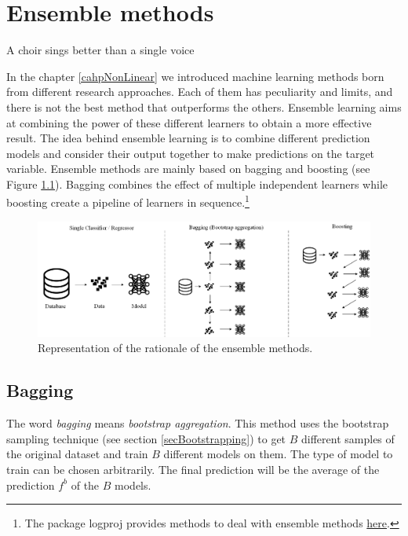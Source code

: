 \chapter{Ensemble methods}{A choir sings better than a single voice} \label{cahpEnsemble}

In the chapter \ref{cahpNonLinear} we introduced machine learning methods born from different research approaches. Each of them has peculiarity and limits, and there is not the best method that outperforms the others. Ensemble learning aims at combining the power of these different learners to obtain a more effective result. The idea behind ensemble learning is to combine different prediction models and consider their output together to make predictions on the target variable. Ensemble methods are mainly based on bagging and boosting (see Figure \ref{fig_ensemble}). Bagging combines the effect of multiple independent learners while boosting create a pipeline of learners in sequence.\footnote{The package logproj provides methods to deal with ensemble methods \href{https://github.com/aletuf93/logproj/blob/master/logproj/M_learningMethod/ensemble_methods.py}{here}.}

\begin{figure}[hbt!]
\centering
\includegraphics[width=1\textwidth]{SectionLetsMath/ensembleMethods_fig/fig_ensemble.png}
\captionsetup{type=figure}
\caption{Representation of the rationale of the ensemble methods.}
\label{fig_ensemble}
\end{figure}

\section{Bagging}
The word \textit{bagging} means \textit{bootstrap aggregation}. This method uses the bootstrap sampling technique (see section \ref{secBootstrapping}) to get $B$ different samples of the original dataset and train $B$ different models on them. The type of model to train can be chosen arbitrarily. The final prediction will be the average of the prediction $f^b$ of the $B$ models.

